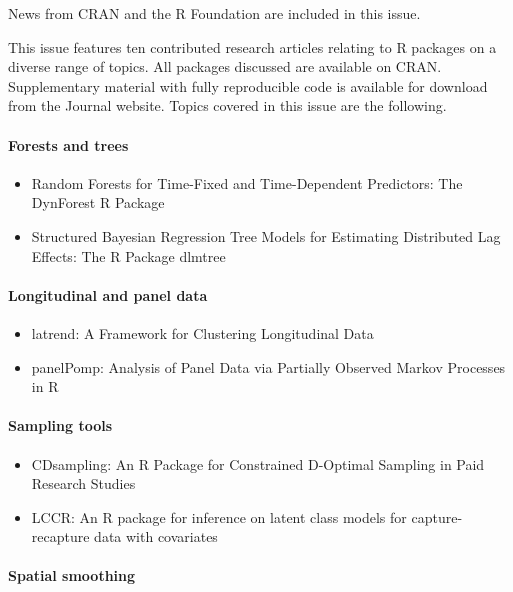 News from CRAN and the R Foundation are included in this issue.

This issue features ten contributed research articles relating to R
packages on a diverse range of topics. All packages discussed are available on CRAN.
Supplementary material with fully reproducible code is available for download
from the Journal website. Topics covered in this issue are the following.

\paragraph{Forests and trees}\label{forests-and-trees}

\begin{itemize}
\tightlist
\item
  Random Forests for Time-Fixed and Time-Dependent Predictors: The DynForest R Package
\item
  Structured Bayesian Regression Tree Models for Estimating Distributed Lag Effects: The R Package dlmtree
\end{itemize}

\paragraph{Longitudinal and panel data}\label{longitudinal-and-panel-data}

\begin{itemize}
\tightlist
\item
  latrend: A Framework for Clustering Longitudinal Data
\item
  panelPomp: Analysis of Panel Data via Partially Observed Markov Processes in R
\end{itemize}

\paragraph{Sampling tools}\label{sampling-tools}

\begin{itemize}
\tightlist
\item
  CDsampling: An R Package for Constrained D-Optimal Sampling in Paid Research Studies
\item
  LCCR: An R package for inference on latent class models for capture-recapture data with covariates
\end{itemize}

\paragraph{Spatial smoothing}\label{spatial-smoothing}


